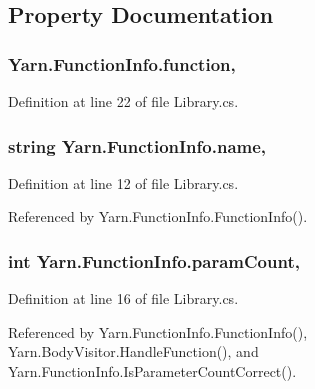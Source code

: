 \subsection{Property Documentation}
\hypertarget{a00096_a1dd2f9d11614a2fce170b3f3eecdb5f9}{
\subsubsection[{function}]{ Yarn.\-Function\-Info.\-function\hspace{0.3cm}{\ttfamily [get]}, {\ttfamily [set]}}}\label{a00096_a1dd2f9d11614a2fce170b3f3eecdb5f9}


Definition at line 22 of file Library.\-cs.

\hypertarget{a00096_adb38e83e3c1597b553aeff14bef5bfcb}{
\subsubsection[{name}]{\setlength{\rightskip}{0pt plus 5cm}string Yarn.\-Function\-Info.\-name\hspace{0.3cm}{\ttfamily [get]}, {\ttfamily [set]}}}\label{a00096_adb38e83e3c1597b553aeff14bef5bfcb}


Definition at line 12 of file Library.\-cs.



Referenced by Yarn.\-Function\-Info.\-Function\-Info().

\hypertarget{a00096_aa8527de9e4f153b05164ccaf167c3186}{
\subsubsection[{param\-Count}]{\setlength{\rightskip}{0pt plus 5cm}int Yarn.\-Function\-Info.\-param\-Count\hspace{0.3cm}{\ttfamily [get]}, {\ttfamily [set]}}}\label{a00096_aa8527de9e4f153b05164ccaf167c3186}


Definition at line 16 of file Library.\-cs.



Referenced by Yarn.\-Function\-Info.\-Function\-Info(), Yarn.\-Body\-Visitor.\-Handle\-Function(), and Yarn.\-Function\-Info.\-Is\-Parameter\-Count\-Correct().

